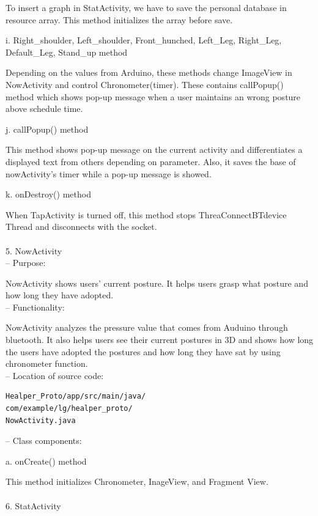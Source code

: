 \documentclass[conference]{IEEEtran}
\begin{document}
To insert a graph in StatActivity, we have to save the personal database in resource array. This method initializes the array before save.

i. Right\_{}shoulder, Left\_{}shoulder, Front\_{}hunched, Left\_{}Leg, Right\_{}Leg, Default\_{}Leg, Stand\_{}up method

Depending on the values from Arduino, these methods change ImageView in NowActivity and control Chronometer(timer). These contains callPopup() method which shows pop-up message when a user maintains an wrong posture above schedule time.

j. callPopup() method

This method shows pop-up message on the current activity and differentiates a displayed text from others depending on parameter. Also, it saves the base of nowActivity's timer while a pop-up message is showed.

k. onDestroy() method

When TapActivity is turned off, this method stops ThreaConnectBTdevice Thread and disconnects with the socket.\\\\

5.	NowActivity\\

 --	Purpose:

NowActivity shows users' current posture. It helps users grasp what posture and how long they have adopted.  \\

 --	Functionality:

NowActivity analyzes the pressure value that comes from Auduino through bluetooth. It also helps users see their current postures in 3D and shows how long the users have adopted the postures and how long they have sat by using chronometer function.\\

 --	Location of source code:
 
\begin{verbatim}
Healper_Proto/app/src/main/java/
com/example/lg/healper_proto/
NowActivity.java
\end{verbatim}

 --	Class components:

a. onCreate() method 

This method initializes Chronometer, InageView, and Fragment View.\\\\


6.	StatActivity\\
\end{document}
